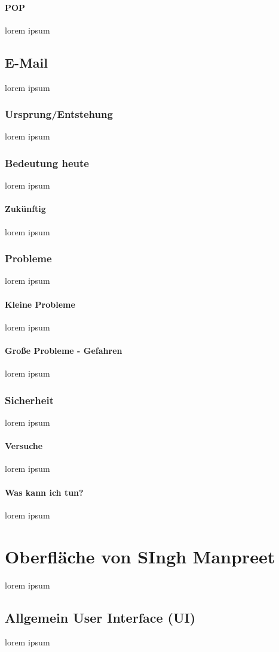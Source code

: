 \documentclass[10pt,a4paper]{report}
\begin{document}
\paragraph{POP}
lorem ipsum
\subsection{E-Mail}
lorem ipsum
\subsubsection{Ursprung/Entstehung}
lorem ipsum
\subsubsection{Bedeutung heute}
lorem ipsum
\paragraph{Zukünftig}
lorem ipsum
\subsubsection{Probleme}
lorem ipsum
\paragraph{Kleine Probleme}
lorem ipsum
\paragraph{Große Probleme - Gefahren}
lorem ipsum
\subsubsection{Sicherheit}
lorem ipsum
\paragraph{Versuche}
lorem ipsum
\paragraph{Was kann ich tun?}
lorem ipsum
\section{Oberfläche von SIngh Manpreet}
lorem ipsum
\subsection{Allgemein User Interface (UI)}
lorem ipsum
\end{document}
